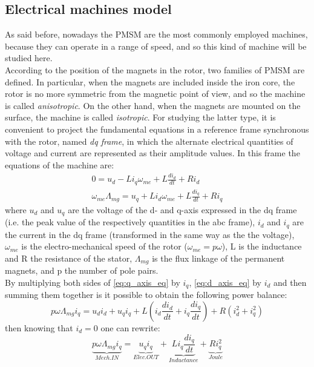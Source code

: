 \subsection{Electrical machines model}
As said before, nowadays the \acrfull{PMSM} are the most commonly employed machines, because they can operate in a range of speed, and so this kind of machine will be studied here.\\
According to the position of the magnets in the rotor, two families of \acrshort{PMSM} are defined. In particular, when the magnets are included inside the iron core, the rotor is no more symmetric from the magnetic point of view, and so the machine is called \textit{anisotropic}. On the other hand, when the magnets are mounted on the surface, the machine is called \textit{isotropic}. For studying the latter type, it is convenient to project the fundamental equations in a reference frame synchronous with the rotor, named \textit{dq frame}, in which the alternate electrical quantities of voltage and current are represented as their amplitude values. 
In this frame the equations of the machine are:
\begin{gather}
  0=u_d-Li_q\omega_{me}+L\frac{di_d}{dt}+Ri_d 
  \label{eq:d_axis_eq}\\
  \omega_{me}\Lambda_{mg}=u_q+Li_d\omega_{me}+L\frac{di_q}{dt}+Ri_q
  \label{eq:q_axis_eq}
\end{gather}
where $u_d$ and $u_q$ are the voltage of the d- and q-axis expressed in the dq frame (i.e. the peak value of the respectively quantities in the abc frame), $i_d$ and $i_q$ are the current in the dq frame (transformed in the same way as the the voltage), $\omega_{me}$ is the electro-mechanical speed of the rotor ($\omega_{me}=p\omega$), L is the inductance and R the resistance of the stator, $\Lambda_{mg}$ is the flux linkage of the permanent magnets, and p the number of pole pairs.\\
By multiplying both sides of \autoref{eq:q_axis_eq} by $i_q$, \autoref{eq:d_axis_eq} by $i_d$ and then summing them together is it possible to obtain the following power balance:
\begin{equation}
  p\omega\Lambda_{mg}i_q=u_di_d + u_qi_q+ L\left(i_d\frac{di_d}{dt} + i_q\frac{di_q}{dt}\right) + R(i_d^2 + i_q^2)
  \label{eq:gen_power_balance}
\end{equation}
then knowing that $i_d=0$ one can rewrite:
\begin{equation}
  \underbrace{p\omega\Lambda_{mg}i_q}_{Mech. IN} = \underbrace{u_qi_q}_{Elec. OUT}+ \underbrace{L i_q\frac{di_q}{dt}}_{Inductance} + \underbrace{Ri_q^2}_{Joule}
  \label{eq:gen_power_balance2}
\end{equation}
